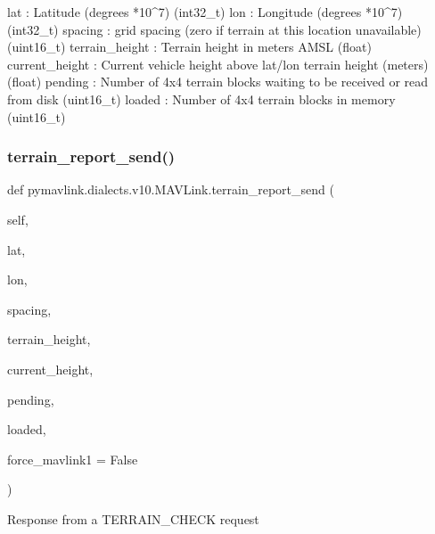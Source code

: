 \begin{DoxyVerb}
\begin{DoxyVerb}
\begin{DoxyVerb}
\begin{DoxyVerb}
\begin{DoxyVerb}
\begin{DoxyVerb}
\begin{DoxyVerb}
\begin{DoxyVerb}
\begin{DoxyVerb}
\begin{DoxyVerb}
\begin{DoxyVerb}
lat                       : Latitude (degrees *10^7) (int32_t)
lon                       : Longitude (degrees *10^7) (int32_t)
spacing                   : grid spacing (zero if terrain at this location unavailable) (uint16_t)
terrain_height            : Terrain height in meters AMSL (float)
current_height            : Current vehicle height above lat/lon terrain height (meters) (float)
pending                   : Number of 4x4 terrain blocks waiting to be received or read from disk (uint16_t)
loaded                    : Number of 4x4 terrain blocks in memory (uint16_t)\end{DoxyVerb}
 \mbox{\label{classpymavlink_1_1dialects_1_1v10_1_1MAVLink_ad59214aad4f79848933ce6e90f5e9145}} 
\subsubsection{\texorpdfstring{terrain\+\_\+report\+\_\+send()}{terrain\_report\_send()}}
{\footnotesize\ttfamily def pymavlink.\+dialects.\+v10.\+M\+A\+V\+Link.\+terrain\+\_\+report\+\_\+send (\begin{DoxyParamCaption}\item[{}]{self,  }\item[{}]{lat,  }\item[{}]{lon,  }\item[{}]{spacing,  }\item[{}]{terrain\+\_\+height,  }\item[{}]{current\+\_\+height,  }\item[{}]{pending,  }\item[{}]{loaded,  }\item[{}]{force\+\_\+mavlink1 = {\ttfamily False} }\end{DoxyParamCaption})}

\begin{DoxyVerb}Response from a TERRAIN_CHECK request


\end{DoxyVerb}
\end{DoxyVerb}
\end{DoxyVerb}
\end{DoxyVerb}
\end{DoxyVerb}
\end{DoxyVerb}
\end{DoxyVerb}
\end{DoxyVerb}
\end{DoxyVerb}
\end{DoxyVerb}
\end{DoxyVerb}
